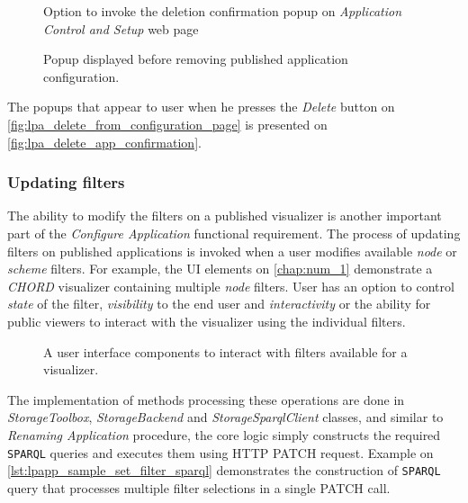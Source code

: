 \begin{figure}[hbt]
  \caption{Option to invoke the deletion confirmation popup on \textit{Application Control and Setup} web page}
  \label{fig:lpa_delete_from_configuration_page}
\endminipage\hfill
{}
  \caption{Popup displayed before removing published application configuration.}
  \label{fig:lpa_delete_app_confirmation}
\endminipage\hfill
\end{figure}

The popups that appear to user when he presses the \textit{Delete} button on \autoref{fig:lpa_delete_from_configuration_page} is presented on \autoref{fig:lpa_delete_app_confirmation}.

\subsubsection{Updating filters}
\label{ssssec:updating_filters_implementation}

The ability to modify the filters on a published visualizer is another important part of the \textit{Configure Application} functional requirement. The process of updating filters on published applications is invoked when a user modifies available \textit{node} or \textit{scheme} filters. For example, the UI elements on \autoref{chap:num_1} demonstrate a \textit{CHORD} visualizer containing multiple \textit{node} filters. User has an option to control \textit{state} of the filter, \textit{visibility} to the end user and \textit{interactivity} or the ability for public viewers to interact with the visualizer using the individual filters. 

\begin{figure}[h]
\centering
{}
\caption{A user interface components to interact with filters available for a visualizer.}
\label{fig:lpa_filters_interactions}
\end{figure}


The implementation of methods processing these operations are done in \textit{StorageToolbox}, \textit{StorageBackend} and \textit{StorageSparqlClient} classes, and similar to \textit{Renaming Application} procedure, the core logic simply constructs the required \texttt{SPARQL} queries and executes them using HTTP PATCH request. Example on \autoref{lst:lpapp_sample_set_filter_sparql} demonstrates the construction of \texttt{SPARQL} query that processes multiple filter selections in a single PATCH call.  

